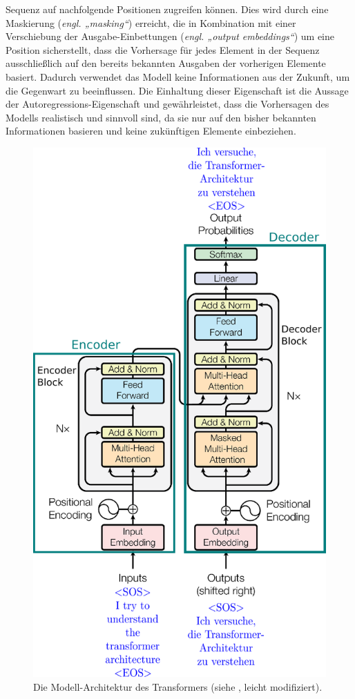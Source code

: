 Sequenz auf nachfolgende Positionen zugreifen können. Dies wird durch eine Maskierung (\emph{engl. „masking“}) erreicht, die in Kombination mit einer Verschiebung der Ausgabe-Einbettungen (\emph{engl. „output embeddings“}) um eine Position sicherstellt, dass die Vorhersage für jedes Element in der Sequenz ausschließlich auf den bereits bekannten Ausgaben der vorherigen Elemente basiert. Dadurch verwendet das Modell keine Informationen aus der Zukunft, um die Gegenwart zu beeinflussen. Die Einhaltung dieser Eigenschaft ist die Aussage der Autoregressions-Eigenschaft und gewährleistet, dass die Vorhersagen des Modells realistisch und sinnvoll sind, da sie nur auf den bisher bekannten Informationen basieren und keine zukünftigen Elemente einbeziehen.

\begin{figure}[htb]
	\centering
	\includegraphics[width=.4\textwidth]{figures/transformer_architecture}
	\caption{Die Modell-Architektur des Transformers (siehe \cite{Attention_is_all_you_need}, leicht modifiziert).}
	\label{Abb:transformer_architecture}
\end{figure}
